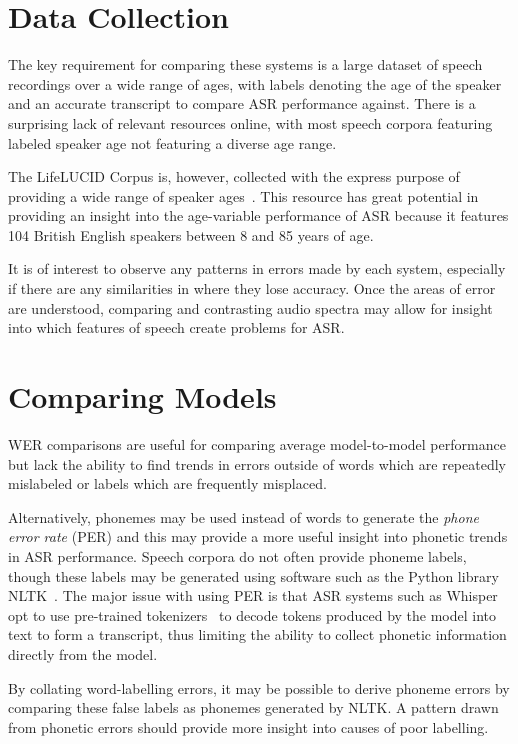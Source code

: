 \section{Data Collection}\label{sec:data-collection}

The key requirement for comparing these systems is a large dataset of speech recordings over a
wide range of ages, with labels denoting the age of the speaker and an accurate transcript to
compare ASR performance against.
There is a surprising lack of relevant resources online, with most speech corpora featuring
labeled speaker age not featuring a diverse age range.

The LifeLUCID Corpus is, however, collected with the express purpose of providing a wide range of
speaker ages~\cite{lifelucid}.
This resource has great potential in providing an insight into the age-variable performance of
ASR because it features 104 British English speakers between 8 and 85 years of age.

It is of interest to observe any patterns in errors made by each system, especially if there are
any similarities in where they lose accuracy.
Once the areas of error are understood, comparing and contrasting audio spectra may allow for
insight into which features of speech create problems for ASR\@.

\section{Comparing Models}\label{sec:comparing-models}

WER comparisons are useful for comparing average model-to-model performance but lack the ability
to find trends in errors outside of words which are repeatedly mislabeled or labels which are
frequently misplaced.

Alternatively, phonemes may be used instead of words to generate the \emph{phone error rate}
(PER) and this may provide a more useful insight into phonetic trends in ASR performance.
Speech corpora do not often provide phoneme labels, though these labels may be generated using
software such as the Python library NLTK~\cite{nltk}.
The major issue with using PER is that ASR systems such as Whisper opt to use pre-trained
tokenizers~\cite{huggingfacetransformers} to decode tokens produced by the model into text to
form a transcript, thus limiting the ability to collect phonetic information directly from the
model.

By collating word-labelling errors, it may be possible to derive phoneme errors by comparing
these false labels as phonemes generated by NLTK\@.
A pattern drawn from phonetic errors should provide more insight into causes of poor labelling.

